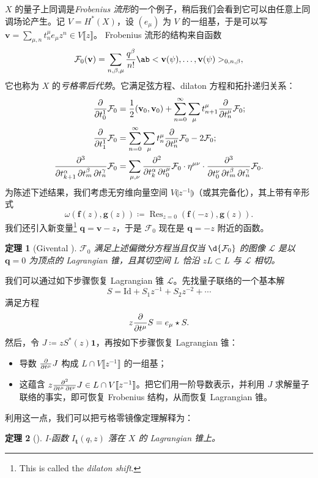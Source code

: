 \documentclass{amsart}
\newtheorem{thm}{定理}[section]
\theoremstyle{definition}
\theoremstyle{remark}
\theoremstyle{plain}
\theoremstyle{definition}
\theoremstyle{remark}
\newcommand{\mc}[1]{\mathcal{#1}}
\newcommand{\mbf}[1]{\mathbf{#1}}
\newcommand{\bv}{\mbf{v}}
\newcommand{\bq}{\mbf{q}}
\newcommand{\mr}[1]{\mathrm{#1}}
\newcommand{\on}[1]{\operatorname{#1}}
\newcommand{\1}{\mathbf{1}}
\newcommand{\2}{\mathbf{2}}
\newcommand{\3}{\mathbf{3}}
\newcommand{\ps}[1]{\llbracket #1 \rrbracket}
\newcommand{\ls}[1]{\llparenthesis #1 \rrparenthesis}
\begin{document}
\(X\) 的量子上同调是\textit{Frobenius 流形}的一个例子，稍后我们会看到它可以由任意上同调场论产生。记 \(V = H^*(X)\)，设 \((e_{\mu})\) 为 \(V\) 的一组基，于是可以写 $\bv = \sum_{\mu,n} t^{\mu}_n e_{\mu} z^n \in V\ps{z}$。
Frobenius 流形的结构来自函数
\[
    \mc{F}_0(\bv) = \sum_{n, \beta, \mu} \frac{q^{\beta}}{n!} \ab<\bv(\psi), \ldots, \bv(\psi)>_{0,n,\beta},
\]
它也称为 \(X\) 的\textit{亏格零后代势}。它满足弦方程、dilaton 方程和拓扑递归关系：
\begin{align*}
    \pdv{}{t_0^1} \mc{F}_0 &= \frac{1}{2} (\bv_0, \bv_0) + \sum_{n=0}^{\infty} \sum_{\mu} t_{n+1}^{\mu} \pdv{}{t_n^{\mu}} \mc{F}_0; \\
    \pdv{}{t_1^1} \mc{F}_0 &= \sum_{n=0}^{\infty} \sum_{\mu} t_n^{\mu} \pdv{}{t_n^{\mu}}\mc{F}_0 - 2 \mc{F}_0; \\
    \pdv{}{t_{k+1}^{\alpha},t_m^{\beta},t_n^{\gamma}} \mc{F}_0 &= \sum_{\mu,\nu} \pdv{}{t_k^{\alpha},t_0^{\mu}} \mc{F}_0 \cdot \eta^{\mu\nu} \cdot \pdv{}{t_0^{\nu},t_{m}^{\beta},t_n^{\gamma}} \mc{F}_0.
\end{align*}
为陈述下述结果，我们考虑无穷维向量空间 $V\ls{z^{-1}}$（或其完备化），其上带有辛形式
\[ \omega(\mbf{f}(z), \mbf{g}(z)) \coloneqq \on{Res}_{z=0}(\mbf{f}(-z), \mbf{g}(z)). \]
我们还引入新变量\footnote{This is called the \textit{dilaton shift}.} $\bq = \bv - z$，于是 \(\mc{F}_0\) 现在是 \(\bq = -z\) 附近的函数。

\begin{thm}[Givental {\cite{Givental2004}}]
    \(\mc{F}_0\) 满足上述偏微分方程当且仅当 \(\d{\mc{F}_0}\) 的图像 \(\mc{L}\) 是以 \(\bq = 0\) 为顶点的 Lagrangian 锥，且其切空间 \(L\) 恰沿 \(zL \subset L\) 与 \(\mc{L}\) 相切。
\end{thm}

我们可以通过如下步骤恢复 Lagrangian 锥 \(\mc{L}\)。先找量子联络的一个基本解
\[ S = \mr{Id} + S_1 z^{-1} + S_2 z^{-2} + \cdots \]
满足方程
\[ z \pdv{}{t^{\mu}}S = e_{\mu} \star S. \]
然后，令 $J \coloneqq z S^*(z) \1$，再按如下步骤恢复 Lagrangian 锥：
\begin{itemize}
    \item 导数 \(\pdv{}{t^{\mu}} J\) 构成 \(L \cap V\ps{z^{-1}}\) 的一组基；
    \item 这蕴含 \(z \pdv{}{t^{\mu},t^{\nu}} J \in L \cap V \ps{z^{-1}}\)。把它们用一阶导数表示，并利用 \(J\) 求解量子联络的事实，即可恢复 Frobenius 结构，从而恢复 Lagrangian 锥。
\end{itemize}

利用这一点，我们可以把亏格零镜像定理解释为：
\begin{thm}[{\cite{Givental1998}}]
    I-函数 \(I_{\mbf{t}}(q,z)\) 落在 \(X\) 的 Lagrangian 锥上。
\end{thm}
\end{document}
